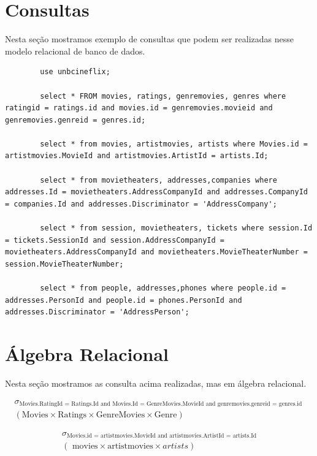 \documentclass[a4paper,10pt]{article}
\begin{document}
\section{Consultas}

Nesta seção mostramos exemplo de consultas que podem ser realizadas nesse modelo relacional de banco de dados.

\begin{lstlisting}
		use unbcineflix;
		
		select * FROM movies, ratings, genremovies, genres where ratingid = ratings.id and movies.id = genremovies.movieid and genremovies.genreid = genres.id;
		
		select * from movies, artistmovies, artists where Movies.id = artistmovies.MovieId and artistmovies.ArtistId = artists.Id;
		
		select * from movietheaters, addresses,companies where addresses.Id = movietheaters.AddressCompanyId and addresses.CompanyId = companies.Id and addresses.Discriminator = 'AddressCompany';
		
		select * from session, movietheaters, tickets where session.Id = tickets.SessionId and session.AddressCompanyId = movietheaters.AddressCompanyId and movietheaters.MovieTheaterNumber = session.MovieTheaterNumber;
		
		select * from people, addresses,phones where people.id = addresses.PersonId and people.id = phones.PersonId and addresses.Discriminator = 'AddressPerson';
\end{lstlisting}

\section{Álgebra Relacional}

Nesta seção mostramos as consulta acima realizadas, mas em álgebra relacional.

\begin{eqnarray*}
\sigma_{\textrm{Movies.RatingId = Ratings.Id and Movies.Id = GenreMovies.MovieId and genremovies.genreid = genres.id }}\\
(\textrm{Movies} \times \textrm{Ratings} \times \textrm{GenreMovies} \times \textrm{Genre})
\end{eqnarray*}

\begin{eqnarray*}
\sigma_{\textrm{Movies.id = artistmovies.MovieId and artistmovies.ArtistId = artists.Id}}\\
( \textrm{ movies} \times  \textrm{artistmovies} \times{ artists} )
\end{eqnarray*}
\end{document}
